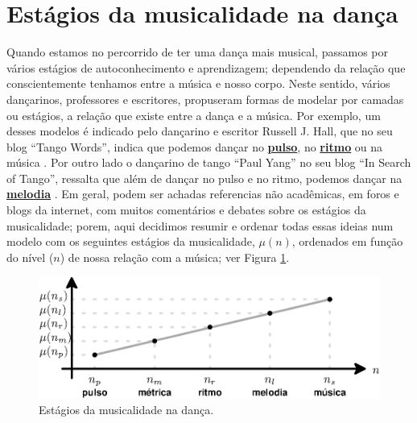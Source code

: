 
\section{Estágios da musicalidade na dança}
\label{sec:aspectosusicalidade}
Quando estamos no percorrido de ter uma dança mais musical,
passamos por vários estágios de autoconhecimento e aprendizagem; 
dependendo da relação que conscientemente tenhamos entre a música e nosso corpo.
Neste sentido, vários dançarinos, professores e escritores,
propuseram formas de modelar por camadas ou estágios, a relação que existe entre a dança e a música.
Por exemplo, um desses modelos é indicado pelo dançarino e escritor Russell J. Hall,
que no seu blog ``Tango Words'', 
indica que podemos dançar no \hyperref[ref:Pulso]{\textbf{pulso}}, 
no \hyperref[sec:pos:Ritmo]{\textbf{ritmo}} ou na música \cite{TangoWordsEstagiosMusicalidade1}.
Por outro lado o dançarino de tango ``Paul Yang'' no seu blog ``In Search of Tango'',
ressalta que além de dançar no pulso e no ritmo, 
podemos  dançar na \hyperref[sec:pos:Melodia]{\textbf{melodia}} \cite{InSearchOfTangoEstagiosMusicalidade1}.
Em geral, podem ser achadas referencias não acadêmicas, em foros e blogs da internet,
com muitos comentários e debates sobre os estágios da musicalidade;
porem, aqui decidimos resumir e ordenar todas essas ideias num modelo com os seguintes estágios da musicalidade, $\mu(n)$,
ordenados em função do nível ($n$) de nossa relação com a música; ver Figura \ref{fig:aspectos-musica-mu}.

\begin{figure}[h!]
    \centering
    \includegraphics[width=\textwidth]{chapters/cap-musicalidade-tecnica/temporallatex-aspectos-musica-latex.eps}
    \caption{Estágios da musicalidade na dança.}
    \label{fig:aspectos-musica-mu}
\end{figure}

